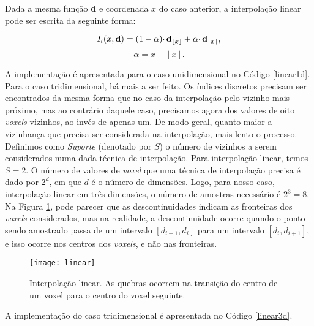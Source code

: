 Dada a mesma função {\bf d} e coordenada $x$ do caso anterior, a interpolação linear pode ser escrita da seguinte forma:
\begin{center}
\[I_{l}(x, {\bf d}) = (1 - \alpha) \cdotp {\bf d}_{\left\lfloor x \right\rfloor} + \alpha \cdotp {\bf d}_{\left\lceil x \right\rceil}, \]
\[
\alpha = x - \left\lfloor x \right\rfloor.\]
\end{center}

A implementação é apresentada para o caso unidimensional no Código \ref{linear1d}. Para o caso tridimensional, há mais a ser feito. Os índices discretos precisam ser encontrados da mesma forma que no caso da interpolação pelo vizinho mais próximo, mas ao contrário daquele caso, precisamos agora dos valores de oito \emph{voxels} vizinhos, ao invés de apenas um. De modo geral, quanto maior a vizinhança que precisa ser considerada na interpolação, mais lento o processo. Definimos como \emph{Suporte} (denotado por $S$) o número de vizinhos a serem considerados numa dada técnica de interpolação. Para interpolação linear, temos $S = 2$. O número de valores de \emph{voxel} que uma técnica de interpolação precisa é dado por $2^{d}$, em que $d$ é o número de dimensões. Logo, para nosso caso, interpolação linear em três dimensões, o número de amostras necessário é $2^{3} = 8$. Na Figura \ref{linearInterp}, pode parecer que as descontinuidades indicam as fronteiras dos \emph{voxels} considerados, mas na realidade, a descontinuidade ocorre quando o ponto sendo amostrado passa de um intervalo $[d_{i-1}, d_{i}]$ para um intervalo $[d_{i}, d_{i+1}]$, e isso ocorre nos centros dos \emph{voxels}, e não nas fronteiras.

\begin{figure}[!htb]

\end{figure}

\begin{figure}[!htb]
\center
\texttt{[image: linear]}
\caption{Interpolação linear. As quebras ocorrem na transição do centro de um voxel para o centro do voxel seguinte.}
\label{linearInterp}
\end{figure}

A implementação do caso tridimensional é apresentada no Código \ref{linear3d}. \\

\begin{figure}[!htb]

\end{figure}

